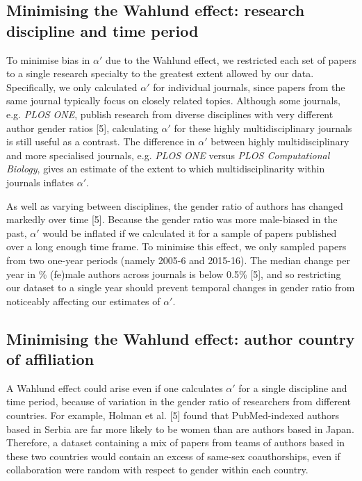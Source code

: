 \documentclass[12pt,]{article}
\begin{document}
\hypertarget{minimising-the-wahlund-effect-research-discipline-and-time-period}{%
\subsection{Minimising the Wahlund effect: research discipline and time
period}\label{minimising-the-wahlund-effect-research-discipline-and-time-period}}

To minimise bias in \(\alpha'\) due to the Wahlund effect, we restricted
each set of papers to a single research specialty to the greatest extent
allowed by our data. Specifically, we only calculated \(\alpha'\) for
individual journals, since papers from the same journal typically focus
on closely related topics. Although some journals, e.g. \emph{PLOS ONE},
publish research from diverse disciplines with very different author
gender ratios {[}5{]}, calculating \(\alpha'\) for these highly
multidisciplinary journals is still useful as a contrast. The difference
in \(\alpha'\) between highly multidisciplinary and more specialised
journals, e.g. \emph{PLOS ONE} versus \emph{PLOS Computational Biology},
gives an estimate of the extent to which multidisciplinarity within
journals inflates \(\alpha'\).

As well as varying between disciplines, the gender ratio of authors has
changed markedly over time {[}5{]}. Because the gender ratio was more
male-biased in the past, \(\alpha'\) would be inflated if we calculated
it for a sample of papers published over a long enough time frame. To
minimise this effect, we only sampled papers from two one-year periods
(namely 2005-6 and 2015-16). The median change per year in \% (fe)male
authors across journals is below 0.5\% {[}5{]}, and so restricting our
dataset to a single year should prevent temporal changes in gender ratio
from noticeably affecting our estimates of \(\alpha'\).

\hypertarget{minimising-the-wahlund-effect-author-country-of-affiliation}{%
\subsection{Minimising the Wahlund effect: author country of
affiliation}\label{minimising-the-wahlund-effect-author-country-of-affiliation}}

A Wahlund effect could arise even if one calculates \(\alpha'\) for a
single discipline and time period, because of variation in the gender
ratio of researchers from different countries. For example, Holman et
al. {[}5{]} found that PubMed-indexed authors based in Serbia are far
more likely to be women than are authors based in Japan. Therefore, a
dataset containing a mix of papers from teams of authors based in these
two countries would contain an excess of same-sex coauthorships, even if
collaboration were random with respect to gender within each country.
\end{document}
